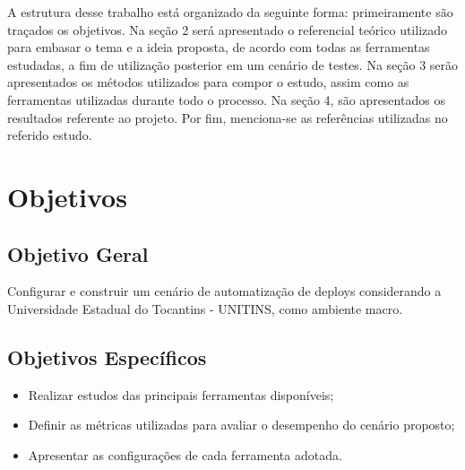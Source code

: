 A estrutura desse trabalho está organizado da seguinte forma: primeiramente são traçados os objetivos. Na seção 2 será apresentado o referencial teórico utilizado para embasar o tema e a ideia proposta, de acordo com todas as ferramentas estudadas, a fim de utilização posterior em um cenário de testes. Na seção 3 serão apresentados os métodos utilizados para compor o estudo, assim como as ferramentas utilizadas durante todo o processo. Na seção 4, são apresentados os resultados referente ao projeto. Por fim, menciona-se as referências utilizadas no referido estudo.

\section{Objetivos}
\subsection{Objetivo Geral }
Configurar e construir um cenário de automatização de deploys considerando a Universidade Estadual do Tocantins - UNITINS, como ambiente macro.

\begin{comment}
Este é um comentário
\end{comment}

\subsection{Objetivos Específicos}
\begin{itemize}
	
\item Realizar estudos das principais ferramentas disponíveis;

\item Definir as métricas utilizadas para avaliar o desempenho do cenário proposto;

\item Apresentar as configurações de cada ferramenta adotada.

\end{itemize}
